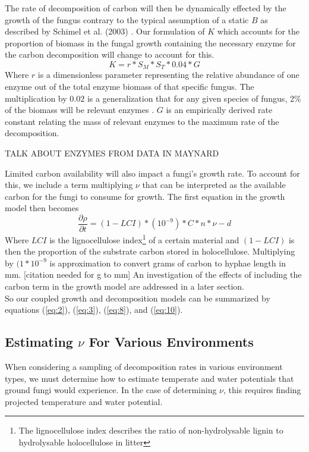 \documentclass[12pt]{article}
\begin{document}
\begin{multicols}{2}
The rate of decomposition of carbon will then be dynamically effected by the growth of the fungus contrary to the typical assumption of a static $B$ as described by Schimel et al. (2003) \cite{Schimel2003}. Our formulation of $K$ which accounts for the proportion of biomass in the fungal growth containing the necessary enzyme for the carbon decomposition will change to account for this. 
\begin{equation} \label {eq}
K = r*S_{M}*S_{T}*0.04*G
\end{equation}
Where $r$ is a dimensionless parameter representing the relative abundance of one enzyme out of the total enzyme biomass of that specific fungus. The multiplication by $0.02$ is a generalization that for any given species of fungus, 2\% of the biomass will be relevant enzymes \cite{Moorhead2006}. $G$ is an empirically derived rate constant relating the mass of relevant enzymes to the maximum rate of the decomposition.

TALK ABOUT ENZYMES FROM DATA IN MAYNARD

Limited carbon availability will also impact a fungi's growth rate. To account for this, we include a term multiplying $\nu$ that can be interpreted as the available carbon for the fungi to consume for growth. The first equation in the growth model then becomes
\begin{equation} \label{eq:10}
\frac{\partial \rho}{\partial t} = (1-LCI)*(10^{-9})*C*n*\nu - d
\end{equation}
Where $LCI$ is the lignocellulose index\footnote{The lignocellulose index describes the ratio of non-hydrolysable lignin to hydrolysable holocellulose in litter} of a certain material and $(1-LCI)$ is then the proportion of the substrate carbon stored in holocellulose. Multiplying by $(1*10^{-9}$ is approximation to convert grams of carbon to hyphae length in mm. [citation needed for g to mm] An investigation of the effects of including the carbon term in the growth model are addressed in a later section. \\

So our coupled growth and decomposition models can be summarized by equations (\ref{eq:2}), (\ref{eq:3}), (\ref{eq:8}), and (\ref{eq:10}).

\subsection{Estimating $\nu$ For Various Environments}

When considering a sampling of decomposition rates in various environment types, we must determine how to estimate temperate and water potentials that ground fungi would experience. In the case of determining $\nu$, this requires finding projected temperature and water potential.


\end{multicols}
\end{document}
